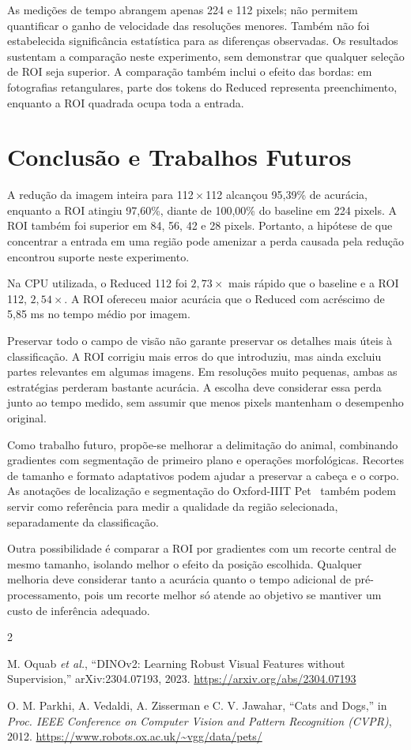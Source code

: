 \documentclass[conference]{IEEEtran}
\begin{document}
As medições de tempo abrangem apenas 224 e 112 pixels; não permitem
quantificar o ganho de velocidade das resoluções menores. Também
não foi estabelecida significância estatística para as diferenças
observadas. Os resultados sustentam a comparação neste experimento,
sem demonstrar que qualquer seleção de ROI seja superior. A comparação
também inclui o efeito das bordas: em fotografias retangulares, parte
dos tokens do Reduced representa preenchimento, enquanto a ROI
quadrada ocupa toda a entrada.

\section{Conclusão e Trabalhos Futuros}
A redução da imagem inteira para 112\,$\times$\,112 alcançou 95,39\%
de acurácia, enquanto a ROI atingiu 97,60\%, diante de 100,00\%
do baseline em 224 pixels. A ROI também foi superior em 84, 56,
42 e 28 pixels. Portanto, a hipótese de que concentrar a entrada
em uma região pode amenizar a perda causada pela redução encontrou
suporte neste experimento.

Na CPU utilizada, o Reduced 112 foi $2{,}73\times$ mais rápido que
o baseline e a ROI 112, $2{,}54\times$. A ROI ofereceu maior acurácia
que o Reduced com acréscimo de 5,85 ms no tempo médio por imagem.

Preservar todo o campo de visão não garante preservar os detalhes
mais úteis à classificação. A ROI corrigiu mais erros do que
introduziu, mas ainda excluiu partes relevantes em algumas imagens.
Em resoluções muito pequenas, ambas as estratégias perderam bastante
acurácia. A escolha deve considerar essa perda junto ao tempo medido,
sem assumir que menos pixels mantenham o desempenho original.

Como trabalho futuro, propõe-se melhorar a delimitação do animal,
combinando gradientes com segmentação de primeiro plano e operações
morfológicas. Recortes de tamanho e formato adaptativos podem ajudar
a preservar a cabeça e o corpo. As anotações de localização e
segmentação do Oxford-IIIT Pet~\cite{pets} também podem servir como
referência para medir a qualidade da região selecionada, separadamente
da classificação.

Outra possibilidade é comparar a ROI por gradientes com um recorte
central de mesmo tamanho, isolando melhor o efeito da posição
escolhida. Qualquer melhoria deve considerar tanto a acurácia quanto
o tempo adicional de pré-processamento, pois um recorte melhor só
atende ao objetivo se mantiver um custo de inferência adequado.

\begin{thebibliography}{2}

M. Oquab \textit{et al.}, ``DINOv2: Learning Robust Visual Features
without Supervision,'' arXiv:2304.07193, 2023.
\url{https://arxiv.org/abs/2304.07193}

O. M. Parkhi, A. Vedaldi, A. Zisserman e C. V. Jawahar,
``Cats and Dogs,'' in \textit{Proc. IEEE Conference on Computer Vision
and Pattern Recognition (CVPR)}, 2012.
\url{https://www.robots.ox.ac.uk/~vgg/data/pets/}

\end{thebibliography}
\end{document}
